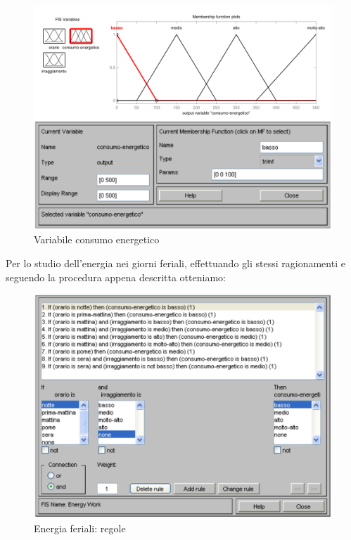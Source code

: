 \begin{figure}[htbp]
  \centering
  \includegraphics[scale=0.5]{images/fuzzy/variabile_consumo_energetico.pdf}
  \caption{Variabile consumo energetico}
\end{figure}

Per lo studio dell'energia nei giorni feriali, effettuando gli stessi ragionamenti e seguendo la procedura appena descritta otteniamo:
\begin{figure}[htbp]
  \centering
  \includegraphics[scale=0.5]{images/fuzzy/energia_feriali_regole.pdf}
  \caption{Energia feriali: regole}
\end{figure}

